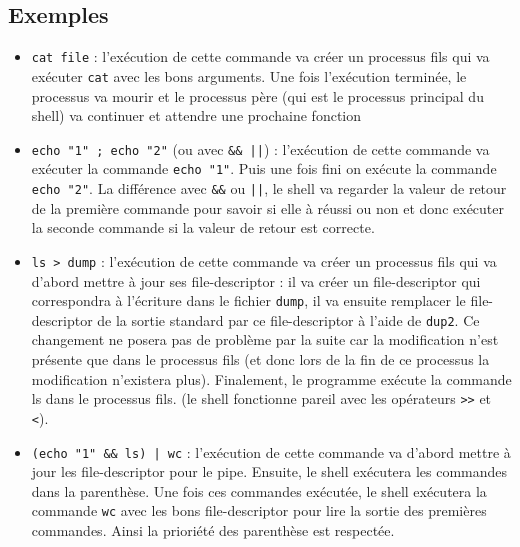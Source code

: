 \documentclass{report}
\begin{document}
\subsection{Exemples}
\begin{itemize}
  \item \verb|cat file| : l'exécution de cette commande va créer un processus fils qui va exécuter \verb|cat| avec les bons arguments. Une fois l'exécution terminée, le processus va mourir et le processus père (qui est le processus principal du shell) va continuer et attendre une prochaine fonction
  \item \verb|echo "1" ; echo "2"| (ou avec \verb$&& ||$) : l'exécution de cette commande va exécuter la commande \verb|echo "1"|. Puis une fois fini on exécute la commande \verb|echo "2"|. La différence avec \verb|&&| ou \verb$||$, le shell va regarder la valeur de retour de la première commande pour savoir si elle à réussi ou non et donc exécuter la seconde commande si la valeur de retour est correcte.
  \item \verb|ls > dump| : l'exécution de cette commande va créer un processus fils qui va d'abord mettre à jour ses file-descriptor : il va créer un file-descriptor qui correspondra à l'écriture dans le fichier \verb|dump|, il va ensuite remplacer le file-descriptor de la sortie standard par ce file-descriptor à l'aide de \verb|dup2|. Ce changement ne posera pas de problème par la suite car la modification n'est présente que dans le processus fils (et donc lors de la fin de ce processus la modification n'existera plus). Finalement, le programme exécute la commande ls dans le processus fils. (le shell fonctionne pareil avec les opérateurs \verb|>>| et \verb|<|).
  \item \verb$(echo "1" && ls) | wc$ : l'exécution de cette commande va d'abord mettre à jour les file-descriptor pour le pipe. Ensuite, le shell exécutera les commandes dans la parenthèse. Une fois ces commandes exécutée, le shell exécutera la commande \verb|wc| avec les bons file-descriptor pour lire la sortie des premières commandes. Ainsi la prioriété des parenthèse est respectée.
\end{itemize}
\end{document}
